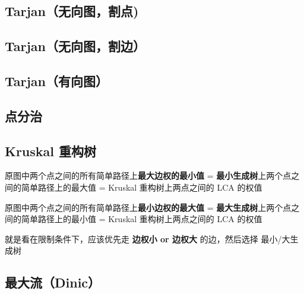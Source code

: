 \documentclass[12pt]{article}
\begin{document}
\subsection{Tarjan（无向图，割点)}



\newpage

\subsection{Tarjan（无向图，割边）}



\newpage

\subsection{Tarjan（有向图）}



\newpage

\subsection{点分治}



\newpage

\subsection{Kruskal 重构树}

原图中两个点之间的所有简单路径上\textbf{最大边权的最小值} = \textbf{最小生成树}上两个点之间的简单路径上的最大值 = Kruskal 重构树上两点之间的 LCA 的权值

原图中两个点之间的所有简单路径上\textbf{最小边权的最大值} = \textbf{最大生成树}上两个点之间的简单路径上的最小值 = Kruskal 重构树上两点之间的 LCA 的权值

就是看在限制条件下，应该优先走 \textbf{边权小 or 边权大} 的边，然后选择 最小/大生成树



\newpage

\subsection{最大流（Dinic）}
\end{document}
